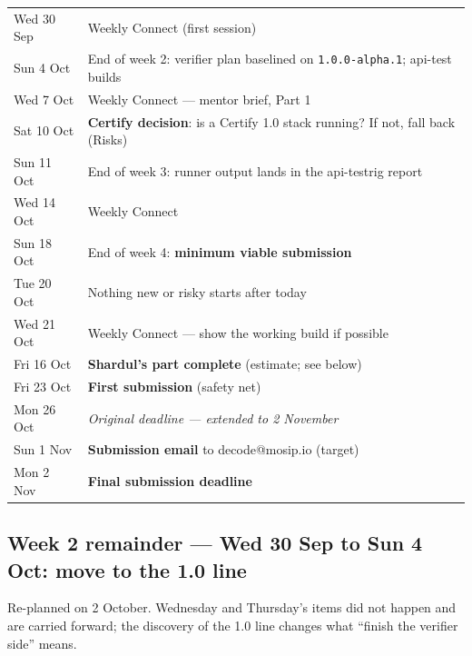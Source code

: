 \documentclass[10pt,a4paper]{article}
\begin{document}
\begin{tabular}{@{}p{3.4cm}p{13cm}@{}}
Wed 30 Sep & Weekly Connect (first session)\\
Sun 4 Oct & End of week 2: verifier plan baselined on \texttt{1.0.0-alpha.1}; api-test builds\\
Wed 7 Oct & Weekly Connect --- mentor brief, Part 1\\
Sat 10 Oct & \textbf{Certify decision}: is a Certify 1.0 stack running? If not, fall back (Risks)\\
Sun 11 Oct & End of week 3: runner output lands in the api-testrig report\\
Wed 14 Oct & Weekly Connect\\
Sun 18 Oct & End of week 4: \textbf{minimum viable submission}\\
Tue 20 Oct & Nothing new or risky starts after today\\
Wed 21 Oct & Weekly Connect --- show the working build if possible\\
Fri 16 Oct & \textbf{Shardul's part complete} (estimate; see below)\\
Fri 23 Oct & \textbf{First submission} (safety net)\\
Mon 26 Oct & \textit{Original deadline --- extended to 2 November}\\
Sun 1 Nov & \textbf{Submission email} to decode@mosip.io (target)\\
Mon 2 Nov & \textbf{Final submission deadline}\\
\end{tabular}

\subsection{Week 2 remainder --- Wed 30 Sep to Sun 4 Oct: move to the 1.0 line}

Re-planned on 2 October. Wednesday and Thursday's items did not happen and are carried
forward; the discovery of the 1.0 line changes what ``finish the verifier side'' means.
\end{document}
